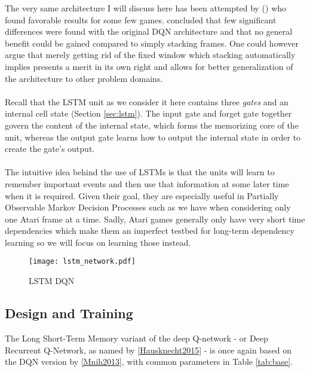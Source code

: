 The very same architecture I will discuss here
has been attempted by
\citeauthor{Hausknecht2015} (\citeyear{Hausknecht2015})
who found favorable results for some few games.
\citeauthor{Hausknecht2015}
concluded that few significant differences
were found with the original DQN architecture
and that no general benefit could be gained compared
to simply stacking frames.
One could however argue
that merely getting rid of the fixed window
which stacking automatically implies
presents a merit in its own right
and allows for better generalization of the architecture
to other problem domains.

\paragraph{}
Recall that the LSTM unit as we consider it here
contains three \textit{gates}
and an internal cell state (Section \ref{sec:lstm}).
The input gate and forget gate together govern
the content of the internal state,
which forms the memorizing core of the unit,
whereas the output gate
learns how to output the internal state
in order to create the gate's output.

\paragraph{}
The intuitive idea behind the use of LSTMs
is that the units will learn to remember important events
and then use that information at some later time
when it is required.
Given their goal,
they are especially useful in Partially Observable Markov Decision Processes
such as we have when considering only one Atari frame at a time.
Sadly, Atari games generally only have very short time dependencies
which make them an imperfect testbed for
long-term dependency learning
so we will focus on learning those instead.

\begin{figure}[htpb]
  \centering
  \texttt{[image: lstm\_network.pdf]}
  \caption{LSTM DQN}
  \label{fig:lstm_network}
\end{figure}

\subsection{Design and Training}
\label{sub:lstm_design_and_training}
The Long Short-Term Memory variant
of the deep Q-network
- or Deep Recurrent Q-Network,
as named by \ref{Hausknecht2015} -
is once again based on the DQN version
by \ref{Mnih2013},
with common parameters in Table \ref{tab:base}.

